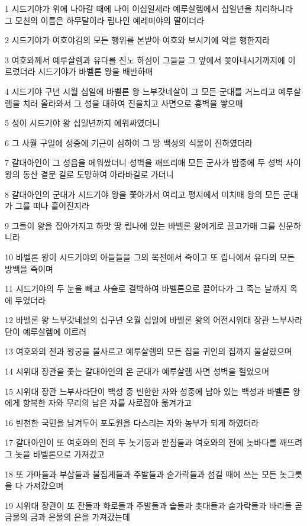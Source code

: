 \par 1 시드기야가 위에 나아갈 때에 나이 이십일세라 예루살렘에서 십일년을 치리하니라 그 모친의 이름은 하무달이라 립나인 예레미야의 딸이더라
\par 2 시드기야가 여호야김의 모든 행위를 본받아 여호와 보시기에 악을 행한지라
\par 3 여호와께서 예루살렘과 유다를 진노 하심이 그들을 그 앞에서 쫓아내시기까지에 이르렀더라 시드기야가 바벨론 왕을 배반하매
\par 4 시드기야 구년 시월 십일에 바벨론 왕 느부갓네살이 그 모든 군대를 거느리고 예루살렘을 치러 올라와서 그 성을 대하여 진을치고 사면으로 흉벽을 쌓으매
\par 5 성이 시드기야 왕 십일년까지 에워싸였더니
\par 6 그 사월 구일에 성중에 기근이 심하여 그 땅 백성의 식물이 진하였더라
\par 7 갈대아인이 그 성읍을 에워쌌더니 성벽을 깨뜨리매 모든 군사가 밤중에 두 성벽 사이 왕의 동산 곁문 길로 도망하여 아라바길로 가더니
\par 8 갈대아인의 군대가 시드기야 왕을 쫓아가서 여리고 평지에서 미치매 왕의 모든 군대가 그를 떠나 흩어진지라
\par 9 그들이 왕을 잡아가지고 하맛 땅 립나에 있는 바벨론 왕에게로 끌고가매 그를 신문하니라
\par 10 바벨론 왕이 시드기야의 아들들을 그의 목전에서 죽이고 또 립나에서 유다의 모든 방백을 죽이며
\par 11 시드기야의 두 눈을 빼고 사슬로 결박하여 바벨론으로 끌어다가 그 죽는 날까지 옥에 두었더라
\par 12 바벨론 왕 느부갓네살의 십구년 오월 십일에 바벨론 왕의 어전시위대 장관 느부사라단이 예루살렘에 이르러
\par 13 여호와의 전과 왕궁을 불사르고 예루살렘의 모든 집을 귀인의 집까지 불살랐으며
\par 14 시위대 장관을 좇는 갈대아인의 온 군대가 예루살렘 사면 성벽을 헐었으며
\par 15 시위대 장관 느부사라단이 백성 중 빈한한 자와 성중에 남아 있는 백성과 바벨론 왕에게 항복한 자와 무리의 남은 자를 사로잡아 옮겨가고
\par 16 빈천한 국민을 남겨두어 포도원을 다스리는 자와 농부가 되게 하였더라
\par 17 갈대아인이 또 여호와의 전의 두 놋기둥과 받침들과 여호와의 전에 놋바다를 깨뜨려 그 놋을 바벨론으로 가져갔고
\par 18 또 가마들과 부삽들과 불집게들과 주발들과 숟가락들과 섬길 때에 쓰는 모든 놋그릇을 다 가져갔으며
\par 19 시위대 장관이 또 잔들과 화로들과 주발들과 솥들과 촛대들과 숟가락들과 바리들 곧 금물의 금과 은물의 은을 가져갔는데
